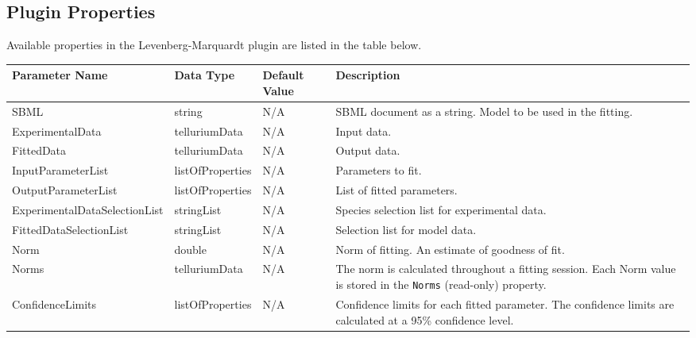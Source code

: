\begin{landscape}
\section{Plugin Properties}
Available properties in the Levenberg-Marquardt plugin are listed in the table below.

\centering %
\begin{longtable}{p{4cm} l p{3cm}  p{10cm}} %

Parameter Name & Data Type & Default Value  & Description \\ [0.5ex] %
\hline %
SBML                            &   string              & N/A    &   SBML document as a string. Model to be used in the fitting. \\
ExperimentalData   				&	telluriumData 		& N/A    &   Input data.  \\
FittedData      				& 	telluriumData    	& N/A    &   Output data. \\
InputParameterList 				&	listOfProperties    & N/A    &   Parameters to fit. \\
OutputParameterList 			&   listOfProperties 	& N/A    &   List of fitted parameters. \\
Experimental\-DataSelectionList & 	stringList			& N/A    &   Species selection list for experimental data. \\
FittedDataSelectionList     	& 	stringList			& N/A    &   Selection list for model data. \\
Norm							&	double				& N/A    &   Norm of fitting. An estimate of goodness of fit. \\
Norms							&	telluriumData		& N/A    &   The norm is calculated throughout a fitting session. Each Norm value is stored in the 	\verb|Norms| (read-only) property. \\

ConfidenceLimits				&	listOfProperties	& N/A    &   Confidence limits for each fitted parameter. The confidence limits are calculated at a 95\% confidence level. \\


\end{longtable}
\end{landscape}
